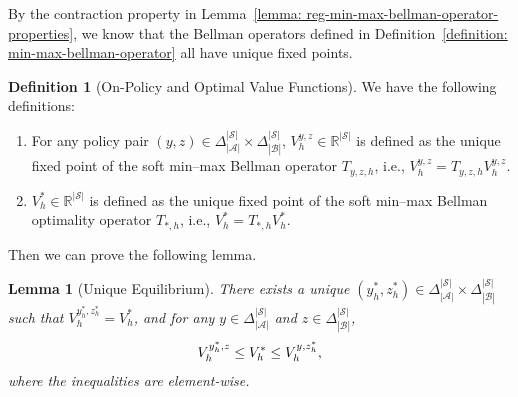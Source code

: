 \documentclass{article}
\theoremstyle{plain}
\newtheorem{lemma}{Lemma}
\theoremstyle{definition}
\newtheorem{definition}{Definition}
\theoremstyle{remark}
\def\cA{\mathcal A}
\def\cB{\mathcal B}
\begin{document}
By the contraction property in Lemma~\ref{lemma: reg-min-max-bellman-operator-properties}, we know that the Bellman operators defined in Definition~\ref{definition: min-max-bellman-operator} all have unique fixed points.
\begin{definition}[On-Policy and Optimal Value Functions]
    \label{definition: bellman-fixed-point-value-functions}
    We have the following definitions:
    \begin{enumerate}
        \item For any policy pair $(y, z) \in \Delta_{|\cA|}^{|\mathcal{S}|} \times \Delta_{|\cB|}^{|\mathcal{S}|}$, $V^{y,z}_h \in \mathbb{R}^{|\mathcal{S}|}$ is defined as the unique fixed point of the soft min--max Bellman operator $T_{y,z,h}$, i.e., $V^{y,z}_h = T_{y,z,h} V^{y,z}_h$.
        \item $V^{*}_h \in \mathbb{R}^{|\mathcal{S}|}$ is defined as the unique fixed point of the soft min--max Bellman optimality operator $T_{*,h}$, i.e., $V^{*}_h = T_{*,h} V^{*}_h$.
    \end{enumerate}
\end{definition}
Then we can prove the following lemma.
\begin{lemma}[Unique Equilibrium]
    \label{lemma: unique-optimal-solution-min-max-mdp}
    There exists a unique $(y_h^*, z_h^*) \in \Delta_{|\cA|}^{|\mathcal{S}|} \times \Delta_{|\cB|}^{|\mathcal{S}|}$ such that $V^{y_h^*,z_h^*}_h = V^{*}_h$, and for any $y \in \Delta_{|\cA|}^{|\mathcal{S}|}$ and $z \in \Delta_{|\cB|}^{|\mathcal{S}|}$, 
    \begin{align}
        V^{y_h^*,z}_h \le V^{*}_h \le V^{y,z_h^*}_h,\notag
    \end{align}
    where the inequalities are element-wise.
\end{lemma}
\end{document}
